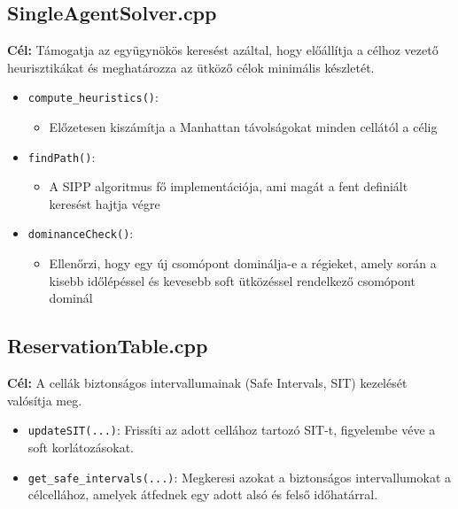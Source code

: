 \documentclass[a4paper,12pt]{article}
\begin{document}
\subsection{SingleAgentSolver.cpp}
\textbf{Cél:} Támogatja az együgynökös keresést azáltal, hogy előállítja a célhoz vezető heurisztikákat és meghatározza az ütköző célok minimális készletét.

\begin{itemize}[label=\textbullet]
    \item \texttt{compute\_heuristics()}:
        \begin{itemize}
            \item Előzetesen kiszámítja a Manhattan távolságokat minden cellától a célig
        \end{itemize}

    \item \texttt{findPath()}:
        \begin{itemize}
            \item A SIPP algoritmus fő implementációja, ami magát a fent definiált keresést hajtja végre
        \end{itemize}

    \item \texttt{dominanceCheck()}:
        \begin{itemize}
            \item Ellenőrzi, hogy egy új csomópont dominálja-e a régieket, amely során a kisebb időlépéssel és kevesebb soft ütközéssel rendelkező csomópont dominál
        \end{itemize}
\end{itemize}

\subsection{ReservationTable.cpp}
\textbf{Cél:} A cellák biztonságos intervallumainak (Safe Intervals, SIT) kezelését valósítja meg.

\begin{itemize}[label=\textbullet]
    \item \texttt{updateSIT(...)}:
    Frissíti az adott cellához tartozó SIT-t, figyelembe véve a soft korlátozásokat.

    \item \texttt{get\_safe\_intervals(...)}:
    Megkeresi azokat a biztonságos intervallumokat a célcellához, amelyek átfednek egy adott alsó és felső időhatárral.
\end{itemize}
\end{document}
